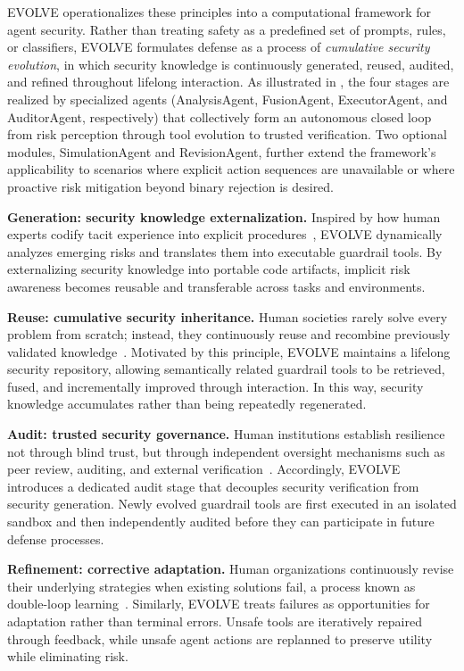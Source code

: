 EVOLVE operationalizes these principles into a computational framework for agent security. Rather than treating safety as a predefined set of prompts, rules, or classifiers, EVOLVE formulates defense as a process of \emph{cumulative security evolution}, in which security knowledge is continuously generated, reused, audited, and refined throughout lifelong interaction. As illustrated in , the four stages are realized by specialized agents (AnalysisAgent, FusionAgent, ExecutorAgent, and AuditorAgent, respectively) that collectively form an autonomous closed loop from risk perception through tool evolution to trusted verification. Two optional modules, SimulationAgent and RevisionAgent, further extend the framework's applicability to scenarios where explicit action sequences are unavailable or where proactive risk mitigation beyond binary rejection is desired.

 \textbf{Generation: security knowledge externalization.} Inspired by how human experts codify tacit experience into explicit procedures~\citep{nonaka1994dynamic,weick2011managing}, EVOLVE dynamically analyzes emerging risks and translates them into executable guardrail tools. By externalizing security knowledge into portable code artifacts, implicit risk awareness becomes reusable and transferable across tasks and environments.

 \textbf{Reuse: cumulative security inheritance.} Human societies rarely solve every problem from scratch; instead, they continuously reuse and recombine previously validated knowledge~\citep{boyd1988culture,henrich2015secret}. Motivated by this principle, EVOLVE maintains a lifelong security repository, allowing semantically related guardrail tools to be retrieved, fused, and incrementally improved through interaction. In this way, security knowledge accumulates rather than being repeatedly regenerated.

 \textbf{Audit: trusted security governance.} Human institutions establish resilience not through blind trust, but through independent oversight mechanisms such as peer review, auditing, and external verification~\citep{taleb2012things,shore2015audit}. Accordingly, EVOLVE introduces a dedicated audit stage that decouples security verification from security generation. Newly evolved guardrail tools are first executed in an isolated sandbox and then independently audited before they can participate in future defense processes.

 \textbf{Refinement: corrective adaptation.} Human organizations continuously revise their underlying strategies when existing solutions fail, a process known as double-loop learning~\citep{argyris1997organizational,senge1990art}. Similarly, EVOLVE treats failures as opportunities for adaptation rather than terminal errors. Unsafe tools are iteratively repaired through feedback, while unsafe agent actions are replanned to preserve utility while eliminating risk.

